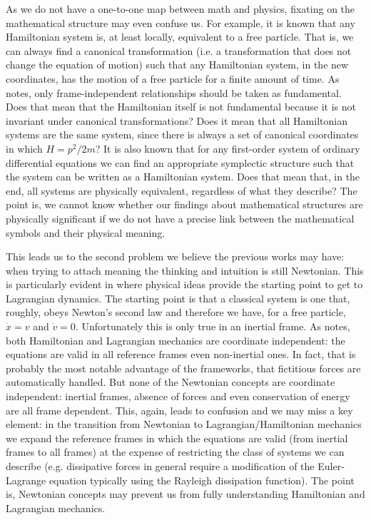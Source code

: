 \documentclass[11pt]{article}
\begin{document}
As we do not have a one-to-one map between math and physics, fixating on the mathematical structure may even confuse us. For example, it is known\cite{AllHamFreeParticle} that any Hamiltonian system is, at least locally, equivalent to a free particle. That is, we can always find a canonical transformation (i.e. a transformation that does not change the equation of motion) such that any Hamiltonian system, in the new coordinates, has the motion of a free particle for a finite amount of time. As \cite{North} notes, only frame-independent relationships should be taken as fundamental. Does that mean that the Hamiltonian itself is not fundamental because it is not invariant under canonical transformations? Does it mean that all Hamiltonian systems are the same system, since there is always a set of canonical coordinates in which $H=p^2/2m$? It is also known\cite{AllSystemsAreHam} that for any first-order system of ordinary differential equations we can find an appropriate symplectic structure such that the system can be written as a Hamiltonian system. Does that mean that, in the end, all systems are physically equivalent, regardless of what they describe? The point is, we cannot know whether our findings about mathematical structures are physically significant if we do not have a precise link between the mathematical symbols and their physical meaning.

This leads us to the second problem we believe the previous works may have: when trying to attach meaning the thinking and intuition is still Newtonian. This is particularly evident in \cite{Curiel} where physical ideas provide the starting point to get to Lagrangian dynamics. The starting point is that a classical system is one that, roughly, obeys Newton's second law and therefore we have, for a free particle, $\dot{x} = v$ and $\dot{v} = 0$. Unfortunately this is only true in an inertial frame. As \cite{North} notes, both Hamiltonian and Lagrangian mechanics are coordinate independent: the equations are valid in all reference frames even non-inertial ones. In fact, that is probably the most notable advantage of the frameworks, that fictitious forces are automatically handled. But none of the Newtonian concepts are coordinate independent: inertial frames, absence of forces and even conservation of energy are all frame dependent. This, again, leads to confusion and we may miss a key element: in the transition from Newtonian to Lagrangian/Hamiltonian mechanics we expand the reference frames in which the equations are valid (from inertial frames to all frames) at the expense of restricting the class of systems we can describe (e.g. dissipative forces in general require a modification of the Euler-Lagrange equation typically using the Rayleigh dissipation function). The point is, Newtonian concepts may prevent us from fully understanding Hamiltonian and Lagrangian mechanics.
\end{document}
